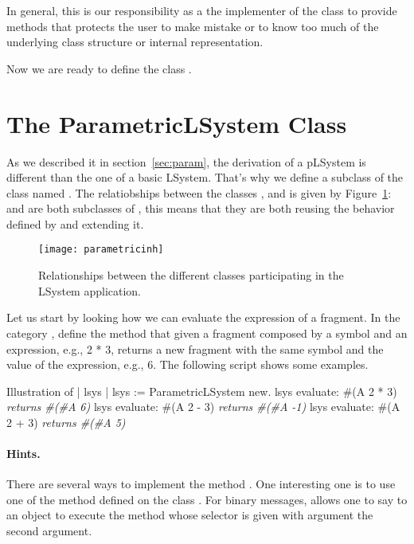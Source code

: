 In general, this is our responsibility as a the implementer of the
class to provide methods that protects the user to make mistake or to
know too much of the underlying class structure or internal
representation.

Now we are ready to define the class .


\section{The ParametricLSystem Class}

As we described it in section~\ref{sec:param}, the derivation of a
pLSystem is different than the one of a basic LSystem. That's why we
define a subclass of the class  named
.  The relatiobships between the classes
,  and  is
given by Figure~\ref{fig:parametric}:  and
 are both subclasses of , this means
that they are both reusing the behavior defined by  and
extending it.

\begin{figure}[!htbp]
\centerline{\texttt{[image: parametricinh]}}
\caption{Relationships between the different classes participating in the LSystem application.}
\label{fig:parametric}
\end{figure}


Let us start by looking how we can evaluate the expression of a
fragment.  In the category , define the method
 that given a fragment composed by a symbol and an
expression, e.g., 2 * 3, returns a new fragment with the same symbol
and the value of the expression, e.g., 6. The following script 
shows some examples.

\begin{scriptwithtitle}{Illustration of }
| lsys |
lsys := ParametricLSystem new.
lsys evaluate: #(A 2 * 3) 
\emph{returns #(#A 6)}
lsys evaluate: #(A 2 - 3) 
\emph{returns #(#A -1)}
lsys evaluate: #(A 2 + 3)
\emph{returns  #(#A 5)}
\end{scriptwithtitle}

\paragraph{Hints.} There are several ways to implement the method 
. One interesting one is to use one of the method  defined on the class .
For binary messages,  allows one to say to an object
to execute the method whose selector is given with argument the second
argument.

